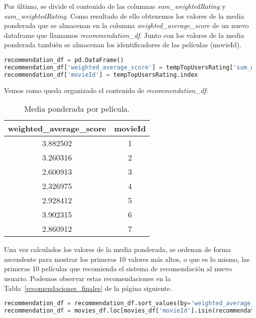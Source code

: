 \documentclass{uimppracticas}
\begin{document}
Por último, se divide el contenido de las columnas \textit{sum\_weightedRating} y \textit{sum\_weightedRating}. Como resultado de ello obtenemos los valores de la media ponderada que se almacenan en la columna \textit{weighted\_average\_score} de un nuevo dataframe que llamamos \textit{recommendation\_df}. Junto con los valores de la media ponderada también se almacenan los identificadores de las películas (movieId).

\begin{lstlisting}[language=python, basicstyle=\footnotesize]
recommendation_df = pd.DataFrame()
recommendation_df['weighted_average_score'] = tempTopUsersRating['sum_weightedRating'] / tempTopUsersRating['sum_similarityIndex']
recommendation_df['movieId'] = tempTopUsersRating.index
\end{lstlisting}

Vemos como queda organizado el contenido de \textit{recommendation\_df}:

\begin{table}[H]
	\centering
	\begin{tabular}{cc}
		\toprule
		weighted\_average\_score &  movieId \\
		\midrule
		3.882502 &        1 \\
		3.260316 &        2 \\
		2.600913 &        3 \\
		2.326975 &        4 \\
		2.928412 &        5 \\
		3.902315 &        6 \\
		2.860912 &        7 \\
		\bottomrule
	\end{tabular}
	\caption{Media ponderada por película.}
	\label{promedio_ponderado_resultado}
\end{table}

Una vez calculados los valores de la media ponderada, se ordenan de forma ascendente para mostrar los primeros 10 valores más altos, o que es lo mismo, las primeras 10 películas que recomienda el sistema de recomendación al nuevo usuario. Podemos observar estas recomendaciones en la Tabla~\ref{recomendaciones_finales} de la página siguiente.

\begin{lstlisting}[language=python, basicstyle=\footnotesize, belowskip=-0.5 \baselineskip]
recommendation_df = recommendation_df.sort_values(by='weighted_average_score', ascending=False)
recommendation_df = movies_df.loc[movies_df['movieId'].isin(recommendation_df.head(10)['movieId'].tolist())]
\end{lstlisting}
\end{document}
